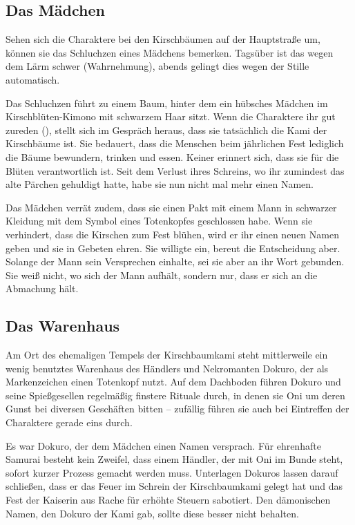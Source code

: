 {		\subsection{Das Mädchen}

			Sehen sich die Charaktere bei den Kirschbäumen auf der Hauptstraße um, können sie das Schluchzen eines Mädchens bemerken. Tagsüber ist das wegen dem Lärm schwer (Wahrnehmung), abends gelingt dies wegen der Stille automatisch.

			Das Schluchzen führt zu einem Baum, hinter dem ein hübsches Mädchen im Kirschblüten-Kimono mit schwarzem Haar sitzt. Wenn die Charaktere ihr gut zureden (), stellt sich im Gespräch heraus, dass sie tatsächlich die Kami der Kirschbäume ist. Sie bedauert, dass die Menschen beim jährlichen Fest lediglich die Bäume bewundern, trinken und essen. Keiner erinnert sich, dass sie für die Blüten verantwortlich ist. Seit dem Verlust ihres Schreins, wo ihr zumindest das alte Pärchen gehuldigt hatte, habe sie nun nicht mal mehr einen Namen.

			Das Mädchen verrät zudem, dass sie einen Pakt mit einem Mann in schwarzer Kleidung mit dem Symbol eines Totenkopfes geschlossen habe. Wenn sie verhindert, dass die Kirschen zum Fest blühen, wird er ihr einen neuen Namen geben und sie in Gebeten ehren. Sie willigte ein, bereut die Entscheidung aber. Solange der Mann sein Versprechen einhalte, sei sie aber an ihr Wort gebunden. Sie weiß nicht, wo sich der Mann aufhält, sondern nur, dass er sich an die Abmachung hält.

		\subsection{Das Warenhaus}

			Am Ort des ehemaligen Tempels der Kirschbaumkami steht mittlerweile ein wenig benutztes Warenhaus des Händlers und Nekromanten Dokuro, der als Markenzeichen einen Totenkopf nutzt. Auf dem Dachboden führen Dokuro und seine Spießgesellen regelmäßig finstere Rituale durch, in denen sie Oni um deren Gunst bei diversen Geschäften bitten -- zufällig führen sie auch bei Eintreffen der Charaktere gerade eins durch.

			Es war Dokuro, der dem Mädchen einen Namen versprach. Für ehrenhafte Samurai besteht kein Zweifel, dass einem Händler, der mit Oni im Bunde steht, sofort kurzer Prozess gemacht werden muss. Unterlagen Dokuros lassen darauf schließen, dass er das Feuer im Schrein der Kirschbaumkami gelegt hat und das Fest der Kaiserin aus Rache für erhöhte Steuern sabotiert. Den dämonischen Namen, den Dokuro der Kami gab, sollte diese besser nicht behalten.

}
